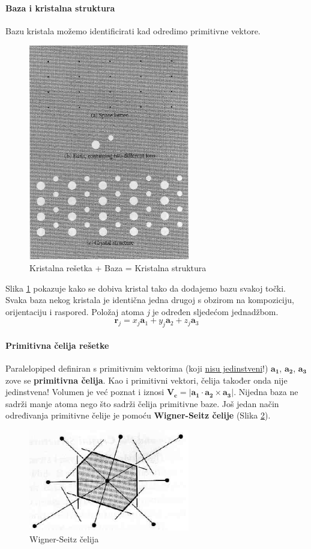 \documentclass{article}
\numberwithin{equation}{section}
\begin{document}
\paragraph{Baza i kristalna struktura}

Bazu kristala možemo identificirati kad odredimo primitivne vektore. 
\begin{figure}[h!]
    \centering
    \includegraphics[width=7cm]{Slika_1.PNG}
    \caption{Kristalna rešetka + Baza = Kristalna struktura}
    \label{fig:S1}
\end{figure}Slika \ref{fig:S1} pokazuje kako se dobiva kristal tako da dodajemo bazu svakoj točki. Svaka baza nekog kristala je identična jedna drugoj s obzirom na kompoziciju, orijentaciju i raspored. 
Položaj atoma \textit{j} je određen sljedećom jednadžbom.
\begin{equation}
    \mathbf{r}_{j}=x_{j} \mathbf{a}_{1}+y_{j} \mathbf{a}_{2}+z_{j} \mathbf{a}_{3}
    \label{EQ3}
\end{equation}
\paragraph{Primitivna čelija rešetke}
Paralelopiped definiran s primitivnim vektorima (koji \underline{nisu jedinstveni}!) $\mathbf{a_1}$, $\mathbf{a_2}$, $\mathbf{a_3}$ 
zove se \textbf{primitivna čelija}. Kao i primitivni vektori, čelija također onda nije jedinstvena! Volumen je već poznat i iznosi 
$\mathbf{V_c}=\left|\mathbf{a_1} \cdot \mathbf{a_2} \times \mathbf{a_3}\right|$. 
Nijedna baza ne sadrži manje atoma nego što sadrži čelija primitivne baze. Još jedan način određivanja primitivne čelije je pomoću 
\textbf{Wigner-Seitz čelije} (Slika \ref{fig:S2}).
\begin{figure}[h!]
    \centering
    \includegraphics[width=7cm]{Slika_2.PNG}
    \caption{Wigner-Seitz čelija}
    \label{fig:S2}
\end{figure}
\end{document}
